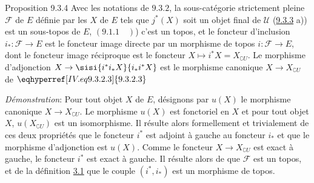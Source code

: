 \documentclass[10pt]{../fichiers-configuration-latex/smfart}
\begin{document}
\begin{enonce*}{Proposition 9.3.4}
Avec les notations de $\hyperref[IV.subsubsec9.3.2]{9.3.2}$, la sous-catégorie
strictement pleine $\mathcal{F}$ de $E$ définie par les 
$X$ de $E$ tels que $j^{\ast}(X)$ soit un objet final de
$\mathcal{U}$ {\rm (\cf \hyperref[IV.prop9.3.3]{9.3.3} a))} est un sous-topos de
$E$, \ie $(\hyperref[IV.def9.1.1]{9.1.1}\quad )$) c'est un topos, et le foncteur
d'inclusion $i_{\ast}:\mathcal{F}\rightarrow E$ est le foncteur
image directe par un morphisme de topos $i:\mathcal{F}\rightarrow
E$, dont le foncteur image réciproque est le foncteur $X\mapsto
i^{\ast}X=X_{\complement U}$. Le morphisme d'adjonction
$X\rightarrow \sisi{i^{\ast}i_{\ast}X}{i_{\ast}i^{\ast}X}$ est le morphisme canonique
$X\rightarrow X_{\complement U}$ de $\eqhyperref[IV.eq9.3.2.3]{9.3.2.3}$
\end{enonce*}

\noindent \emph{Démonstration}: Pour tout objet $X$ de $E$,
désignons par $u(X)$ le morphisme canonique $X\rightarrow
X_{\complement U}$. Le morphisme $u(X)$ est fonctoriel en $X$ et
pour tout objet $X$, $u(X_{\complement U})$ est un isomorphisme. Il
résulte alors formellement et trivialement de ces deux propriétés
que le foncteur $i^{\ast}$ est adjoint à gauche au foncteur
$i_{\ast}$ et que le morphisme d'adjonction est $u(X)$. Comme le
foncteur $X\rightarrow X_{\complement U}$ est exact à gauche, le
foncteur $i^{\ast}$ est exact à gauche. Il résulte alors de
 que $\mathcal{F}$ est un topos, et de la
définition \hyperref[IV.def3.1]{3.1} que le couple $(i^{\ast}, i_{\ast})$ est
un morphisme de topos.

\setcounter{subsubsection}{4}
\end{document}
